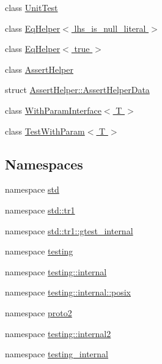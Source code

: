 \begin{DoxyCompactItemize}
\item 
class \hyperlink{classtesting_1_1UnitTest}{\-Unit\-Test}
\item 
class \hyperlink{classtesting_1_1internal_1_1EqHelper}{\-Eq\-Helper$<$ lhs\-\_\-is\-\_\-null\-\_\-literal $>$}
\item 
class \hyperlink{classtesting_1_1internal_1_1EqHelper_3_01true_01_4}{\-Eq\-Helper$<$ true $>$}
\item 
class \hyperlink{classtesting_1_1internal_1_1AssertHelper}{\-Assert\-Helper}
\item 
struct \hyperlink{structtesting_1_1internal_1_1AssertHelper_1_1AssertHelperData}{\-Assert\-Helper\-::\-Assert\-Helper\-Data}
\item 
class \hyperlink{classtesting_1_1WithParamInterface}{\-With\-Param\-Interface$<$ T $>$}
\item 
class \hyperlink{classtesting_1_1TestWithParam}{\-Test\-With\-Param$<$ T $>$}
\end{DoxyCompactItemize}
\subsection*{\-Namespaces}
\begin{DoxyCompactItemize}
\item 
namespace \hyperlink{namespacestd}{std}
\item 
namespace \hyperlink{namespacestd_1_1tr1}{std\-::tr1}
\item 
namespace \hyperlink{namespacestd_1_1tr1_1_1gtest__internal}{std\-::tr1\-::gtest\-\_\-internal}
\item 
namespace \hyperlink{namespacetesting}{testing}
\item 
namespace \hyperlink{namespacetesting_1_1internal}{testing\-::internal}
\item 
namespace \hyperlink{namespacetesting_1_1internal_1_1posix}{testing\-::internal\-::posix}
\item 
namespace \hyperlink{namespaceproto2}{proto2}
\item 
namespace \hyperlink{namespacetesting_1_1internal2}{testing\-::internal2}
\item 
namespace \hyperlink{namespacetesting__internal}{testing\-\_\-internal}
\end{DoxyCompactItemize}
